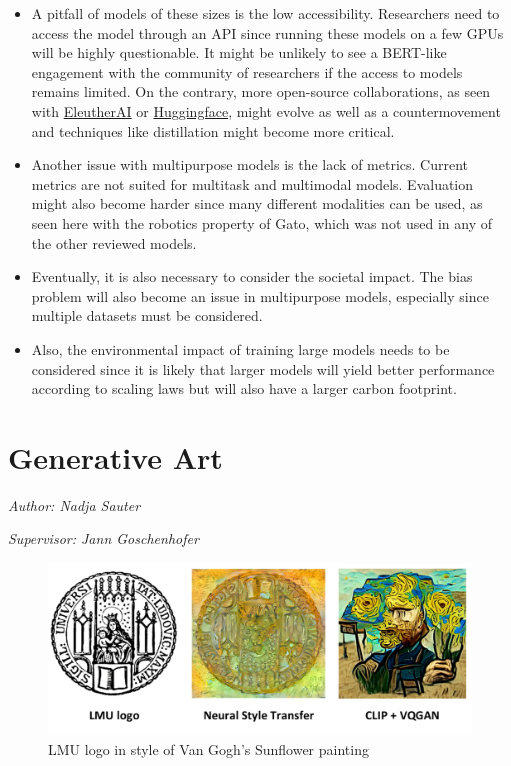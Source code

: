 \documentclass[
]{krantz}
\begin{document}
\begin{itemize}
\item
  A pitfall of models of these sizes is the low accessibility. Researchers need to access the model through an API since running these models on a few GPUs will be highly questionable. It might be
  unlikely to see a BERT-like engagement with the community of researchers if the access to models remains limited. On the contrary, more open-source collaborations, as seen with
  \href{www.eleuther.ai}{EleutherAI} or \href{www.huggingface.co}{Huggingface}, might evolve as well as a countermovement and techniques like distillation \citep{Hinton2015} might become more critical.
\item
  Another issue with multipurpose models is the lack of metrics. Current metrics are not suited for multitask and multimodal models. Evaluation might also become harder since many different
  modalities can be used, as seen here with the robotics property of Gato, which was not used in any of the other reviewed models.
\item
  Eventually, it is also necessary to consider the societal impact. The bias problem will also become an issue in multipurpose models, especially since multiple datasets must be considered.
\item
  Also, the environmental impact of training large models needs to be considered since it is likely that larger models will yield better performance according to scaling laws \citep{Reed2022}
  but will also have a larger carbon footprint.
\end{itemize}

\hypertarget{c03-04-usecase}{%
\section{Generative Art}\label{c03-04-usecase}}

\emph{Author: Nadja Sauter}

\emph{Supervisor: Jann Goschenhofer}

\begin{figure}

{\centering \includegraphics[width=0.9\linewidth]{./figures/03-chapter3/Logo} 

}

\caption{LMU logo in style of Van Gogh's Sunflower painting}\label{fig:Logo}
\end{figure}
\end{document}
